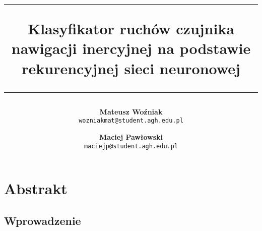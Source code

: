 \documentclass[11pt]{article}
\title{
\rule{\linewidth}{3pt}
Klasyfikator ruchów czujnika nawigacji inercyjnej na podstawie rekurencyjnej sieci neuronowej
\rule{\linewidth}{1pt}
}
\author{
  \textbf{Mateusz Woźniak}\\
  \texttt{wozniakmat@student.agh.edu.pl}
  \and
  \textbf{Maciej Pawłowski}\\
  \texttt{maciejp@student.agh.edu.pl}
}
\date{}
\begin{document}
\maketitle

\section{Abstrakt}
\subsection{Wprowadzenie}
\end{document}
